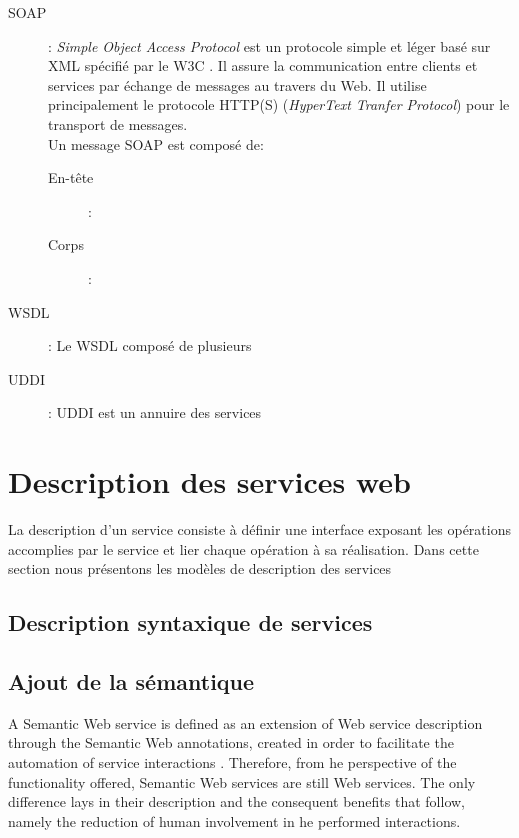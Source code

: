 	\renewcommand{\descriptionlabel}[1]{\hspace{1cm}\textbf{#1}}
	\begin{description}
	    \item[SOAP] : 
		\textit{Simple Object Access Protocol} est un protocole simple et léger basé sur \textsc{XML} spécifié 
		par le \textsc{W3C} \cite{soap_1.2_primer:2014:Misc}. Il assure la communication entre clients et services 
		par échange de messages au travers du Web.  Il utilise principalement le protocole \textsc{HTTP(S)} 
		(\textit{HyperText Tranfer Protocol}) pour le transport de messages.\\

		Un message SOAP est composé de:
		\renewcommand{\descriptionlabel}[1]{\hspace{1cm}\textsf{#1}}
		\begin{description} 
		    \item[En-tête]: 
		    \item[Corps]: 
		\end{description}
	    \item[WSDL] : Le WSDL composé de plusieurs 
	    \item[UDDI] : UDDI est un annuire des services
	\end{description}

     \newpage

\section{Description des services web} 
    La description d’un service consiste à définir une interface exposant les opérations accomplies par le service et 
    lier chaque opération à sa réalisation. Dans cette section nous présentons les modèles de description des services
    	\subsection{Description syntaxique de services}
        \subsection{Ajout de la sémantique}
	    A Semantic Web service is defined as an extension of Web service description through the Semantic Web annotations,
	    created in order to facilitate the automation of service interactions . Therefore, from 
	    he perspective of the functionality offered, Semantic Web services are still Web services. The only difference lays
	    in their description and the consequent benefits that follow, namely the reduction of human involvement in 
	    he performed interactions.\\

